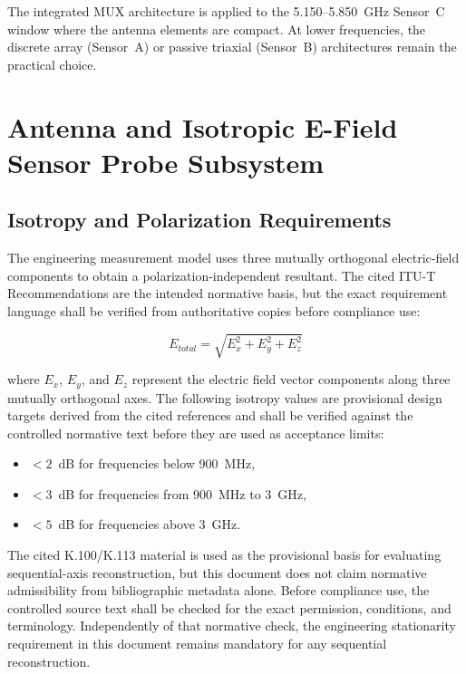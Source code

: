 \documentclass[11pt,a4paper]{article}
\begin{document}
\noindent The integrated MUX architecture is applied to the 5.150--5.850~GHz Sensor~C window where the antenna elements are compact. At lower frequencies, the discrete array (Sensor~A) or passive triaxial (Sensor~B) architectures remain the practical choice.

\section{Antenna and Isotropic E-Field Sensor Probe Subsystem}
\label{sec:antenna_subsystem}

\subsection{Isotropy and Polarization Requirements}

The engineering measurement model uses three mutually orthogonal electric-field components to obtain a polarization-independent resultant. The cited ITU-T Recommendations are the intended normative basis, but the exact requirement language shall be verified from authoritative copies before compliance use:

\begin{equation}
    E_{total} = \sqrt{E_x^2 + E_y^2 + E_z^2}
    \label{eq:isotropic_total}
\end{equation}

\noindent where $E_x$, $E_y$, and $E_z$ represent the electric field vector components along three mutually orthogonal axes. The following isotropy values are provisional design targets derived from the cited references and shall be verified against the controlled normative text before they are used as acceptance limits:

\begin{itemize}
    \item $< 2$~dB for frequencies below 900~MHz,
    \item $< 3$~dB for frequencies from 900~MHz to 3~GHz,
    \item $< 5$~dB for frequencies above 3~GHz.
\end{itemize}

\noindent The cited K.100/K.113 material is used as the provisional basis for evaluating sequential-axis reconstruction, but this document does not claim normative admissibility from bibliographic metadata alone. Before compliance use, the controlled source text shall be checked for the exact permission, conditions, and terminology. Independently of that normative check, the engineering stationarity requirement in this document remains mandatory for any sequential reconstruction.
\end{document}
